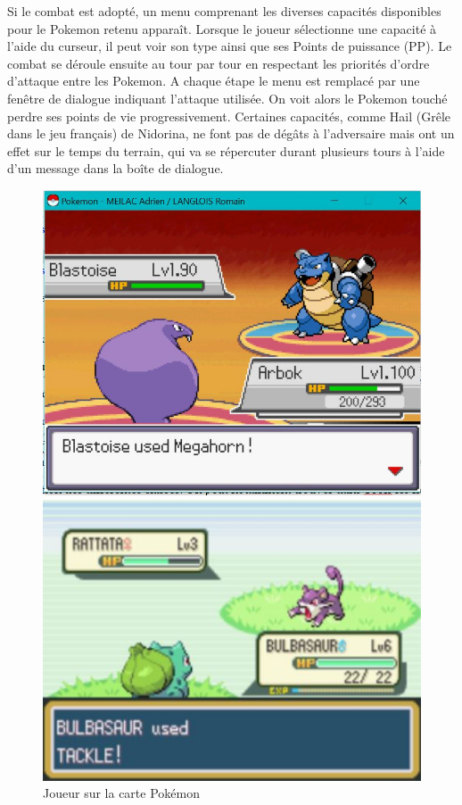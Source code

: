 Si le combat est adopté, un menu comprenant les diverses capacités disponibles pour le Pokemon retenu apparaît. Lorsque le joueur sélectionne une capacité à l'aide du curseur, il peut voir son type ainsi que ses Points de puissance (PP). Le combat se déroule ensuite au tour par tour en respectant les priorités d'ordre d'attaque entre les Pokemon. A chaque étape le menu est remplacé par une fenêtre de dialogue indiquant l'attaque utilisée. On voit alors le Pokemon touché perdre ses points de vie progressivement. Certaines capacités, comme Hail (Grêle dans le jeu français) de Nidorina, ne font pas de dégâts à l'adversaire mais ont un effet sur le temps du terrain, qui va se répercuter durant plusieurs tours à l'aide d'un message dans la boîte de dialogue.

\begin{figure}[!h]
\begin{minipage}{0.49\textwidth}
\includegraphics[scale = 0.6]{../Images/useMove.jpg}
\end{minipage}
\begin{minipage}{0.49\textwidth}
\includegraphics[scale = 0.84]{../Images/vrai_jeu_useMove.jpg}
\end{minipage}
\caption{Joueur sur la carte Pokémon}
\end{figure}


